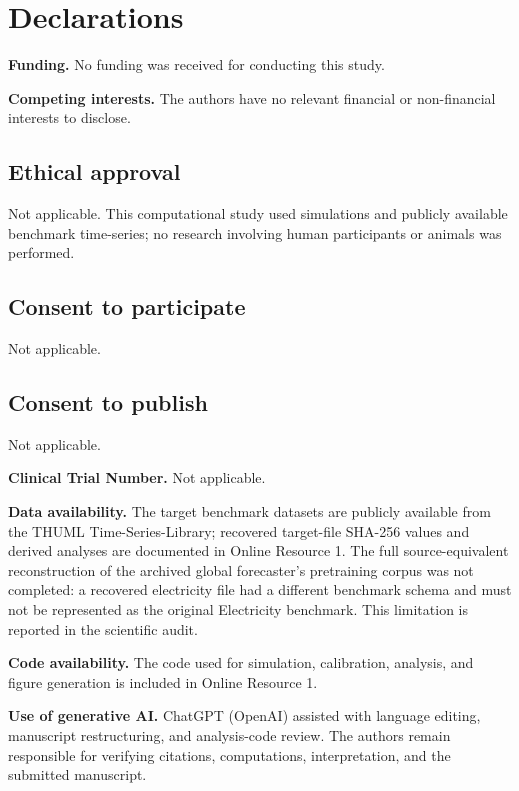 \documentclass[10pt]{article}
\begin{document}
\section*{Declarations}
\textbf{Funding.} No funding was received for conducting this study.

\textbf{Competing interests.} The authors have no relevant financial or non-financial interests to disclose.

\subsection*{Ethical approval}
Not applicable. This computational study used simulations and publicly available benchmark time-series; no research involving human participants or animals was performed.

\subsection*{Consent to participate}
Not applicable.

\subsection*{Consent to publish}
Not applicable.

\textbf{Clinical Trial Number.} Not applicable.

\textbf{Data availability.} The target benchmark datasets are publicly available from the THUML Time-Series-Library; recovered target-file SHA-256 values and derived analyses are documented in Online Resource 1. The full source-equivalent reconstruction of the archived global forecaster's pretraining corpus was not completed: a recovered electricity file had a different benchmark schema and must not be represented as the original Electricity benchmark. This limitation is reported in the scientific audit.

\textbf{Code availability.} The code used for simulation, calibration, analysis, and figure generation is included in Online Resource 1.

\textbf{Use of generative AI.} ChatGPT (OpenAI) assisted with language editing, manuscript restructuring, and analysis-code review. The authors remain responsible for verifying citations, computations, interpretation, and the submitted manuscript.
\end{document}
